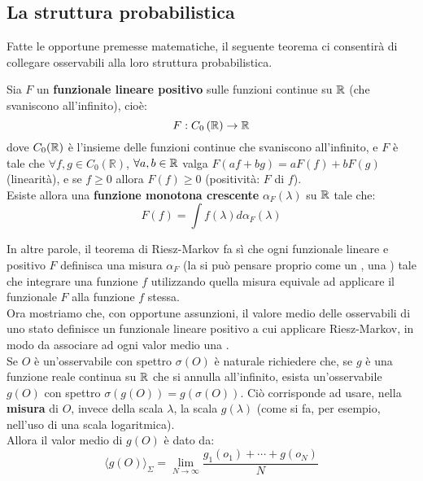 \documentclass[FisicaTeorica.tex]{subfiles}
\begin{document}
\subsection{La struttura probabilistica}
Fatte le opportune premesse matematiche, il seguente teorema ci consentirà di collegare osservabili alla loro struttura probabilistica.
\begin{thm}
Sia $F$ un \textbf{funzionale lineare positivo} sulle funzioni continue su $\mathbb{R}$ (che svaniscono all'infinito), cioè:
\[
F:C_0\left(\mathbb{R}\right)\to \mathbb{R} 
\]
dove $C_0(\mathbb{R})$ è l'insieme delle funzioni continue che svaniscono all'infinito, e $F$ è tale che $\forall f,g\in C_0\left(\mathbb{R}\right)$, $\forall a,b\in \mathbb{R}$ valga $F\left(af+bg\right)=aF\left(f\right)+bF(g)$ (linearità), e se $f\geq 0$ allora $F\left(f\right)\geq 0$ (positività: $F$  di $f$).\\
Esiste allora una \textbf{funzione monotona crescente} $\alpha_F\left(\lambda\right)$ su $\mathbb{R}$ tale che: 
\[
F\left(f\right)=\int f\left(\lambda\right)d\alpha_F\left(\lambda\right)
\]
\end{thm}
In altre parole, il teorema di Riesz-Markov fa sì che ogni funzionale lineare e positivo $F$ definisca una misura $\alpha_F$ (la si può pensare proprio come un , una ) tale che integrare una funzione $f$ utilizzando quella misura equivale ad applicare il funzionale $F$ alla funzione $f$ stessa.\\
Ora mostriamo che, con opportune assunzioni, il valore medio delle osservabili di uno stato definisce un funzionale lineare positivo a cui applicare Riesz-Markov, in modo da associare ad ogni valor medio una .\\
Se $O$ è un'osservabile con spettro $\sigma \left(O\right)$ è naturale richiedere che, se $g$ è una funzione reale continua su $\mathbb{R}$ che si annulla all'infinito, esista un'osservabile $g(O)$ con spettro $\sigma \left(g\left(O\right)\right)=g\left(\sigma\left(O\right)\right)$. Ciò corrisponde ad usare, nella \textbf{misura} di $O$, invece della scala $\lambda$, la scala $g\left(\lambda\right)$ (come si fa, per esempio, nell'uso di una scala logaritmica).\\
Allora il valor medio di $g(O)$ è dato da:
\begin{equation}
\langle g (O)\rangle_\Sigma = \lim_{N\to\infty} \frac{g_1(o_1) + \cdots + g(o_N)}{N}
    \label{eqn:medio-g}
\end{equation}
\end{document}
